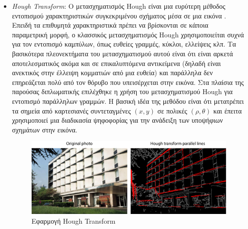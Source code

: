 \begin{itemize}
    \item \emph{Hough Transform}: Ο μετασχηματισμός Hough είναι μια ευρύτερη μέθοδος εντοπισμού χαρακτηριστικών συγκεκριμένου σχήματος μέσα σε μια εικόνα \cite{wiki:hough}. Επειδή τα επιθυμητά χαρακτηριστικά πρέπει να βρίσκονται σε κάποια παραμετρική μορφή, ο κλασσικός μετασχηματισμός Hough χρησιμοποιείται συχνά για τον εντοπισμό καμπύλων, όπως ευθείες γραμμές, κύκλοι, ελλείψεις κλπ. Τα βασικότερα πλεονεκτήματα του μετασχηματισμού αυτού είναι ότι είναι αρκετά αποτελεσματικός ακόμα και σε επικαλυπτόμενα αντικείμενα (δηλαδή είναι ανεκτικός στην έλλειψη κομματιών από μια ευθεία) και παράλληλα δεν επηρεάζεται πολύ από τον θόρυβο που υπεισέρχεται στην εικόνα. Στα πλαίσια της παρούσας διπλωματικής επιλέχθηκε η χρήση του μετασχηματισμού Hough για εντοπισμό παράλληλων γραμμών. Η βασική ιδέα της μεθόδου είναι ότι μετατρέπει τα σημεία από καρτεσιανές συντεταγμένες $(x,y)$ σε πολικές $(\rho,\theta)$ και έπειτα χρησιμοποιεί μια διαδικασία ψηφοφορίας για την ανάδειξη των υποψήφιων σχημάτων στην εικόνα.
    \begin{figure}[H]
        \centering
        \includegraphics[width=\textwidth]{images/Hough_transform_example.png}
        \caption{Εφαρμογή Hough Transform}
        \label{fig:hough-transform-example}
    \end{figure}
\end{itemize}

